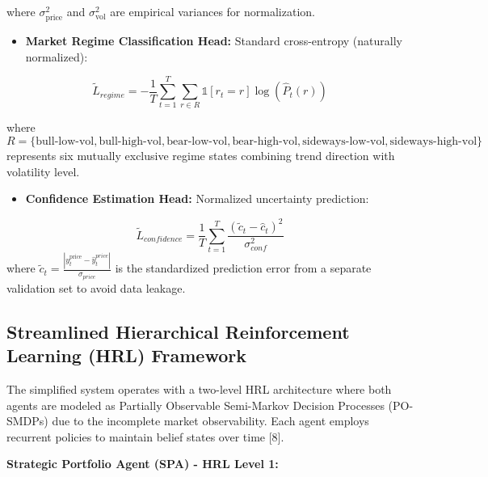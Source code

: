 \documentclass[11pt,a4paper]{article}
\begin{document}
    where $\sigma_{\text{price}}^2$ and $\sigma_{\text{vol}}^2$ are empirical variances for normalization.

\begin{itemize}
\item   \textbf{Market Regime Classification Head:} Standard cross-entropy (naturally normalized):
\end{itemize}
    \begin{equation}
    \tilde{L}_{regime} = -\frac{1}{T} \sum_{t=1}^{T} \sum_{r \in R} \mathbb{1}[r_t = r] \log(\hat{P}_t(r))
\end{equation}

    where $R = \{\text{bull-low-vol}, \text{bull-high-vol}, \text{bear-low-vol}, \text{bear-high-vol}, \text{sideways-low-vol}, \text{sideways-high-vol}\}$ represents six mutually exclusive regime states combining trend direction with volatility level.

\begin{itemize}
\item   \textbf{Confidence Estimation Head:} Normalized uncertainty prediction:
\end{itemize}
\begin{equation}
\tilde{L}_{confidence} = \frac{1}{T} \sum_{t=1}^{T} \frac{(\tilde{c}_t - \hat{c}_t)^2}{\sigma_{conf}^2}
\end{equation}
    where $\tilde{c}_t = \frac{|y_t^{\text{price}} - \hat{y}_t^{price}|}{\sigma_{price}}$ is the standardized prediction error from a separate validation set to avoid data leakage.

\subsection{Streamlined Hierarchical Reinforcement Learning (HRL) Framework}

The simplified system operates with a two-level HRL architecture where both agents are modeled as Partially Observable Semi-Markov Decision Processes (PO-SMDPs) due to the incomplete market observability. Each agent employs recurrent policies to maintain belief states over time [8].

\textbf{Strategic Portfolio Agent (SPA) - HRL Level 1:}
\end{document}
